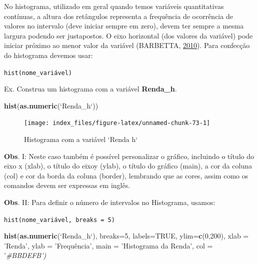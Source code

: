 \documentclass[12pt,brazil,oneside]{book}
\newenvironment{Shaded}{\begin{snugshade}}{\end{snugshade}}
\newcommand{\CommentTok}[1]{\textcolor[rgb]{0.56,0.35,0.01}{\textit{#1}}}
\newcommand{\DataTypeTok}[1]{\textcolor[rgb]{0.13,0.29,0.53}{#1}}
\newcommand{\DecValTok}[1]{\textcolor[rgb]{0.00,0.00,0.81}{#1}}
\newcommand{\KeywordTok}[1]{\textcolor[rgb]{0.13,0.29,0.53}{\textbf{#1}}}
\newcommand{\NormalTok}[1]{#1}
\newcommand{\OtherTok}[1]{\textcolor[rgb]{0.56,0.35,0.01}{#1}}
\newcommand{\StringTok}[1]{\textcolor[rgb]{0.31,0.60,0.02}{#1}}
\begin{document}
No histograma, utilizado em geral quando temos variáveis quantitativas contínuas, a altura dos retângulos representa a frequência de ocorrência de valores no intervalo (deve iniciar sempre em zero), devem ter sempre a mesma largura podendo ser justapostos. O eixo horizontal (dos valores da variável) pode iniciar próximo ao menor valor da variável (BARBETTA, \protect\hyperlink{ref-barbetta1988}{2010}). Para confecção do histograma devemos usar:

\texttt{hist(nome\_variável)}

Ex. Construa um histograma com a variável \textbf{Renda\_h}.

\begin{Shaded}
\begin{Highlighting}[]
\KeywordTok{hist}\NormalTok{(}\KeywordTok{as.numeric}\NormalTok{(}\StringTok{`}\DataTypeTok{Renda_h}\StringTok{`}\NormalTok{))}
\end{Highlighting}
\end{Shaded}

\begin{figure}[H]

{\centering \texttt{[image: index\_files/figure-latex/unnamed-chunk-73-1]} 

}

\caption{Histograma com a variável `Renda h`}\label{fig:unnamed-chunk-73}
\end{figure}

\textbf{Obs}. I: Neste caso também é possível personalizar o gráfico, incluindo o título do eixo x (xlab), o título do eixoy (ylab), o título do gráfico (main), a cor da coluna (col) e cor da borda da coluna (border), lembrando que as cores, assim como os comandos devem ser expressas em inglês.

\textbf{Obs}. II: Para definir o número de intervalos no Histograma, usamos:

\texttt{hist(nome\_variável,\ breaks\ =\ 5)}

\begin{Shaded}
\begin{Highlighting}[]
\KeywordTok{hist}\NormalTok{(}\KeywordTok{as.numeric}\NormalTok{(}\StringTok{`}\DataTypeTok{Renda_h}\StringTok{`}\NormalTok{), }
     \DataTypeTok{breaks=}\DecValTok{5}\NormalTok{, }
     \DataTypeTok{labels=}\OtherTok{TRUE}\NormalTok{, }
     \DataTypeTok{ylim=}\KeywordTok{c}\NormalTok{(}\DecValTok{0}\NormalTok{,}\DecValTok{200}\NormalTok{), }
     \DataTypeTok{xlab =} \StringTok{'Renda'}\NormalTok{,}
     \DataTypeTok{ylab =} \StringTok{'Frequência',}
\StringTok{     main = '}\NormalTok{Histograma da Renda}\StringTok{',}
\StringTok{     col = '}\CommentTok{#BBDEFB')}
\end{Highlighting}
\end{Shaded}
\end{document}
